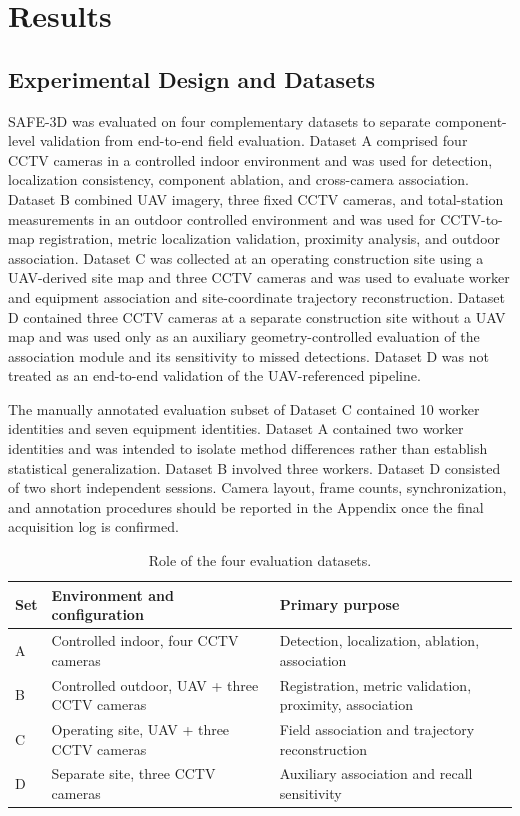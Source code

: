 \section{Results}
\label{sec:results}

\subsection{Experimental Design and Datasets}
SAFE-3D was evaluated on four complementary datasets to separate component-level validation from end-to-end field evaluation. Dataset A comprised four CCTV cameras in a controlled indoor environment and was used for detection, localization consistency, component ablation, and cross-camera association. Dataset B combined UAV imagery, three fixed CCTV cameras, and total-station measurements in an outdoor controlled environment and was used for CCTV-to-map registration, metric localization validation, proximity analysis, and outdoor association. Dataset C was collected at an operating construction site using a UAV-derived site map and three CCTV cameras and was used to evaluate worker and equipment association and site-coordinate trajectory reconstruction. Dataset D contained three CCTV cameras at a separate construction site without a UAV map and was used only as an auxiliary geometry-controlled evaluation of the association module and its sensitivity to missed detections. Dataset D was not treated as an end-to-end validation of the UAV-referenced pipeline.

The manually annotated evaluation subset of Dataset C contained 10 worker identities and seven equipment identities. Dataset A contained two worker identities and was intended to isolate method differences rather than establish statistical generalization. Dataset B involved three workers. Dataset D consisted of two short independent sessions. Camera layout, frame counts, synchronization, and annotation procedures should be reported in the Appendix once the final acquisition log is confirmed.

\begin{table}[t]
\centering
\caption{Role of the four evaluation datasets.}
\label{tab:datasets}
\begin{tabular}{p{0.8cm}p{3.4cm}p{3.6cm}}
\toprule
Set & Environment and configuration & Primary purpose \\
\midrule
A & Controlled indoor, four CCTV cameras & Detection, localization, ablation, association \\
B & Controlled outdoor, UAV + three CCTV cameras & Registration, metric validation, proximity, association \\
C & Operating site, UAV + three CCTV cameras & Field association and trajectory reconstruction \\
D & Separate site, three CCTV cameras & Auxiliary association and recall sensitivity \\
\bottomrule
\end{tabular}
\end{table}

